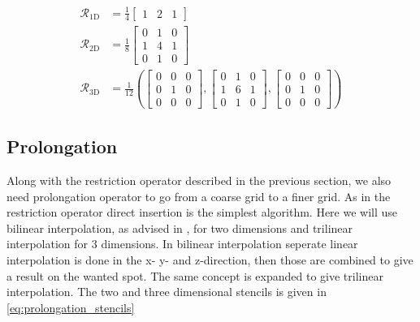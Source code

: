         	\begin{equation}
        		\begin{aligned}
        			\mathcal{R}_{1\text{D}} &= \frac{1}{4}
        			\begin{bmatrix}
        				1 & 2 & 1
        			\end{bmatrix}
        			\\
        			\mathcal{R}_{2\text{D}} &= \frac{1}{8}
        			\begin{bmatrix}
        				0 & 1 & 0
        				\\
        				1 & 4 & 1
        				\\
        				0 & 1 & 0
        			\end{bmatrix}
        			\\
        			\mathcal{R}_{3\text{D}} &= \frac{1}{12} \left(
        			\begin{bmatrix}
        				0 & 0 & 0
        				\\
        				0 & 1 & 0
        				\\
        				0 & 0 & 0
        			\end{bmatrix}
        			,
        			\begin{bmatrix}
        				0 & 1 & 0
        				\\
        				1 & 6 & 1
        				\\
        				0 & 1 & 0
        			\end{bmatrix}
        			,
        			\begin{bmatrix}
        				0 & 0 & 0
        				\\
        				0 & 1 & 0
        				\\
        				0 & 0 & 0
        			\end{bmatrix}
        			\right)
        			\label{eq:restriction_stencils}
        		\end{aligned}
        	\end{equation}

        \subsection{Prolongation}
            \label{sec:prol_simple}

            Along with the restriction operator described in the previous section, we also need prolongation
            operator to go from a coarse grid to a finer grid. As in the restriction
			operator direct insertion is the simplest algorithm. Here we will use bilinear interpolation,
			as advised in \cite{trottenberg_multigrid_2000}, for
            two dimensions and trilinear interpolation for 3 dimensions. In bilinear interpolation seperate
            linear interpolation is done in the x- y- and z-direction, then those are combined to give a result
            on the wanted spot. The same concept is expanded to give trilinear
            interpolation. The two and three dimensional stencils is given in \eqref{eq:prolongation_stencils}

